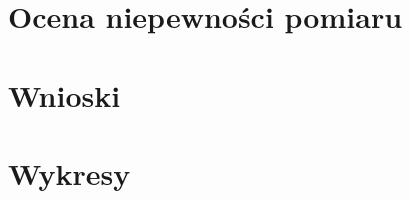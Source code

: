 \documentclass[a4paper,12pt]{article}
\begin{document}
\section{Ocena niepewności pomiaru}

\section{Wnioski}

\section{Wykresy}



\end{document}
